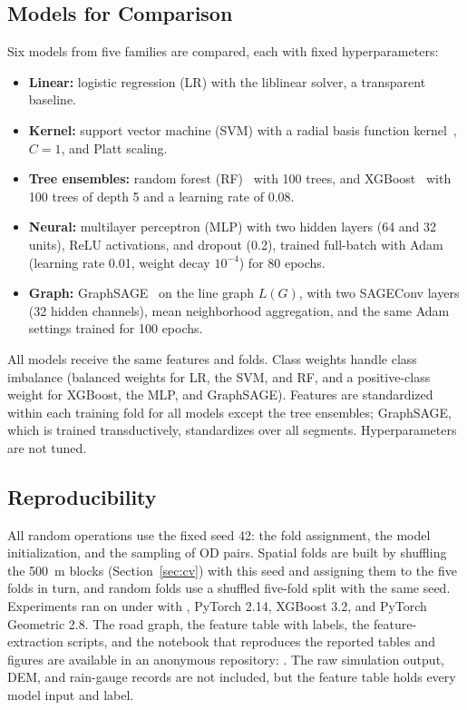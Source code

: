 \subsection{Models for Comparison}
Six models from five families are compared, each with fixed hyperparameters:
\begin{itemize}
  \item \textbf{Linear:} logistic regression (LR) with the liblinear solver, a transparent baseline.
  \item \textbf{Kernel:} support vector machine (SVM) with a radial basis function kernel~\cite{cortes1995}, $C=1$, and Platt scaling.
  \item \textbf{Tree ensembles:} random forest (RF)~\cite{breiman2001} with 100 trees, and XGBoost~\cite{chen2016} with 100 trees of depth 5 and a learning rate of 0.08.
  \item \textbf{Neural:} multilayer perceptron (MLP) with two hidden layers (64 and 32 units), ReLU activations, and dropout (0.2), trained full-batch with Adam (learning rate 0.01, weight decay $10^{-4}$) for 80 epochs.
  \item \textbf{Graph:} GraphSAGE~\cite{hamilton2017} on the line graph $L(G)$, with two SAGEConv layers (32 hidden channels), mean neighborhood aggregation, and the same Adam settings trained for 100 epochs.
\end{itemize}
All models receive the same features and folds. Class weights handle class imbalance (balanced weights for LR, the SVM, and RF, and a positive-class weight for XGBoost, the MLP, and GraphSAGE). Features are standardized within each training fold for all models except the tree ensembles; GraphSAGE, which is trained transductively, standardizes over all segments. Hyperparameters are not tuned.

\subsection{Reproducibility}
\label{sec:repro}
All random operations use the fixed seed 42: the fold assignment, the model initialization, and the sampling of OD pairs. Spatial folds are built by shuffling the 500~m blocks (Section~\ref{sec:cv}) with this seed and assigning them to the five folds in turn, and random folds use a shuffled five-fold split with the same seed. Experiments ran on  under  with , PyTorch 2.14, XGBoost 3.2, and PyTorch Geometric 2.8. The road graph, the feature table with labels, the feature-extraction scripts, and the notebook that reproduces the reported tables and figures are available in an anonymous repository: . The raw simulation output, DEM, and rain-gauge records are not included, but the feature table holds every model input and label.

